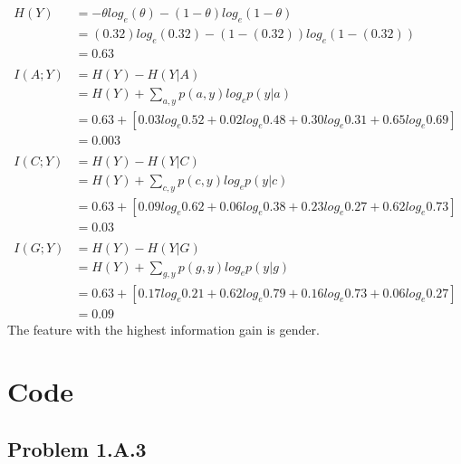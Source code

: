 \documentclass[paper=letterpaper,fontsize=11pt]{article}
\numberwithin{equation}{section}
\numberwithin{table}{section} %
\numberwithin{figure}{section}
\begin{document}
\begin{align*}
H(Y)&=-\theta log_{e}(\theta)-(1-\theta)log_{e}(1-\theta)\\
&=(0.32)log_{e}(0.32)-(1-(0.32))log_{e}(1-(0.32))\\
&=0.63\\\\
I(A;Y) &= H(Y)-H(Y|A)\\
&=H(Y)+\sum_{a,y}p(a,y)log_{e}p(y|a)\\
&=0.63+[0.03log_{e}0.52+0.02log_{e}0.48+0.30log_{e}0.31+0.65log_{e}0.69]\\
&=0.003
\\\\
I(C;Y) &= H(Y)-H(Y|C)\\
&=H(Y)+\sum_{c,y}p(c,y)log_{e}p(y|c)\\
&=0.63+[0.09log_{e}0.62+0.06log_{e}0.38+0.23log_{e}0.27+0.62log_{e}0.73]\\
&=0.03
\\\\
I(G;Y) &= H(Y)-H(Y|G)\\
&=H(Y)+\sum_{g,y}p(g,y)log_{e}p(y|g)\\
&=0.63+[0.17log_{e}0.21+0.62log_{e}0.79+0.16log_{e}0.73+0.06log_{e}0.27]\\
&=0.09
\end{align*}
The feature with the highest information gain is gender.

\section*{Code}
\subsection*{Problem 1.A.3}

\end{document}
